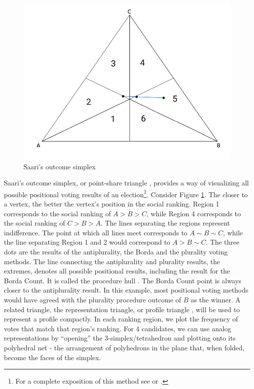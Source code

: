 \documentclass[hidelinks,11pt]{article}
\begin{document}
\begin{figure}[H] \centering \includegraphics[width=0.8\columnwidth,
height=0.3\textheight]{./images/simpletriangle.png}
 \caption{Saari's outcome simplex}
 \label{fig:saari_nurmi}
\end{figure}

Saari's outcome simplex, or point-share triangle
\parencite{eggers20_diagr_analy_ordin_votin_system}, provides a way of
visualizing all possible positional voting results of an election\footnote{For a
complete exposition of this method see \textcite{saari1995basic} or
\textcite{nurmi2002voting}.}. Consider Figure \ref{fig:saari_nurmi}. The closer
to a vertex, the better the vertex's position in the social ranking. Region 1
corresponds to the social ranking of \(A > B > C\), while Region 4 corresponds
to the social ranking of \(C>B>A\). The lines separating the regions represent
indifference. The point at which all lines meet corresponds to
\(A \sim B \sim C\), while the line separating Region 1 and 2 would correspond
to \(A > B \sim C\). The three dots are the results of the antiplurality, the
Borda and the plurality voting methods. The line connecting the antiplurality
and plurality results, the extremes, denotes all possible positional results,
including the result for the Borda Count. It is called the procedure hull
\parencite{saari2001chaotic}. The Borda Count point is always closer to the
antiplurality result. In this example, most positional voting methods would have
agreed with the plurality procedure outcome of \(B\) as the winner. A related
triangle, the representation triangle, or profile triangle
\parencite{eggers20_diagr_analy_ordin_votin_system}, will be used to represent a
profile compactly. In each ranking region, we plot the frequency of votes that
match that region's ranking. For 4 candidates, we can use analog representations
by ``opening'' the 3-simplex/tetrahedron and plotting onto its polyhedral net -
the arrangement of polyhedrons in the plane that, when folded, become the faces
of the simplex.
\end{document}

